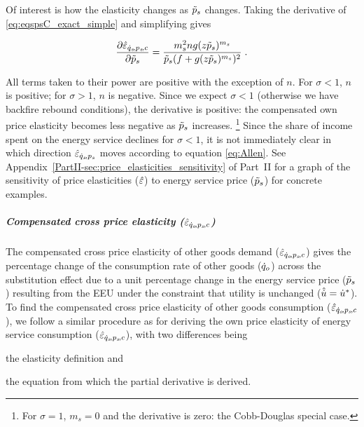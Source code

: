 \documentclass[12pt]{article}\usepackage[]{graphicx}\usepackage[]{xcolor}
\begin{document}
Of interest is how the elasticity changes as $\tilde{p}_s$ changes. Taking
the derivative of \ref{eq:eqspsC_exact_simple} and simplifying gives

\begin{equation} \label{eq:eqspsC_exact_d}
 \pdv{\hat{\varepsilon}_{\dot{q}_s\!,p_s\!,c}}{\tilde{p}_s} = \frac{m_s^2 n g (z \tilde{p}_s)^{m_s}}{\tilde{p}_s(f + g(z \tilde{p}_s)^{m_s})^2} \; .
\end{equation}

All terms taken to their power are positive with the exception of $n$.
For $\sigma < 1$, $n$ is positive; for $\sigma>1$, $n$ is negative.
Since we expect $\sigma < 1$ (otherwise we have backfire rebound conditions),
the derivative is positive: 
the compensated own price
elasticity becomes less negative as $\tilde{p}_s$ increases.%
\footnote{
  For $\sigma = 1$, $m_s = 0$ and the derivative
  is zero: the Cobb-Douglas special case.
}
%
Since the
share of income spent on the energy service declines for $\sigma<1$,
it is not immediately clear in which direction $\hat{\varepsilon}_{\dot{q}_s\!,p_s}$ moves according to equation \ref{eq:Allen}.
See Appendix~\ref{PartII-sec:price_elasticities_sensitivity} of Part~II 
for a graph of the sensitivity of price elasticities ($\hat{\varepsilon}$)
to energy service price ($\tilde{p}_s$) for concrete examples.


\subparagraph{Compensated cross price elasticity ($\hat{\varepsilon}_{\dot{q}_o\!,p_s\!,c}$)} 
\label{sec:eqopsC_CES}

The compensated cross price elasticity of other goods demand ($\hat{\varepsilon}_{\dot{q}_o\!,p_s\!,c}$)
gives the percentage change of the consumption rate of other goods ($\dot{q}_o$)
across the substitution effect
due to a unit percentage change in the energy service price ($\tilde{p}_s$)
resulting from the EEU
under the constraint that utility is unchanged 
($\hat{\dot{u}} = {\dot{u}}^*$).
To find the compensated cross price elasticity of other goods consumption ($\hat{\varepsilon}_{\dot{q}_o\!,p_s\!,c}$),
we follow a similar procedure as for deriving the 
own price elasticity of energy service consumption ($\hat{\varepsilon}_{\dot{q}_s\!,p_s\!,c}$), 
with two differences being 
%
\begin{enumerate*}[label={(\roman*)}]
	
  \item the elasticity definition and
  
  \item the equation from which the partial derivative is derived.
    
\end{enumerate*}
\end{document}
